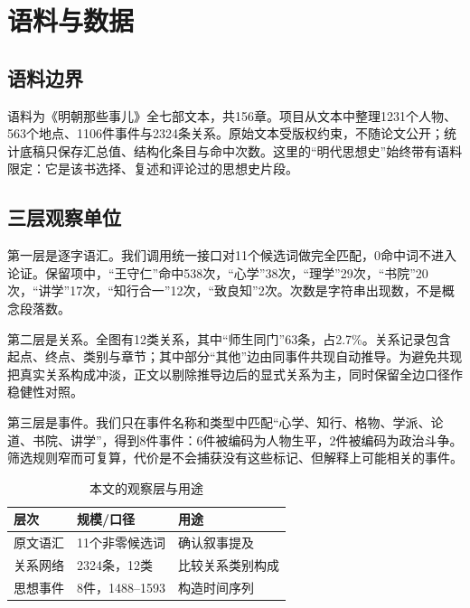 \section{语料与数据}

\subsection{语料边界}

语料为《明朝那些事儿》全七部文本，共156章。项目从文本中整理1231个人物、563个地点、1106件事件与2324条关系。原始文本受版权约束，不随论文公开；统计底稿只保存汇总值、结构化条目与命中次数。这里的“明代思想史”始终带有语料限定：它是该书选择、复述和评论过的思想史片段。

\subsection{三层观察单位}

第一层是逐字语汇。我们调用统一接口对11个候选词做完全匹配，0命中词不进入论证。保留项中，“王守仁”命中538次，“心学”38次，“理学”29次，“书院”20次，“讲学”17次，“知行合一”12次，“致良知”2次。次数是字符串出现数，不是概念段落数。

第二层是关系。全图有12类关系，其中“师生同门”63条，占2.7\%。关系记录包含起点、终点、类别与章节；其中部分“其他”边由同事件共现自动推导。为避免共现把真实关系构成冲淡，正文以剔除推导边后的显式关系为主，同时保留全边口径作稳健性对照。

第三层是事件。我们只在事件名称和类型中匹配“心学、知行、格物、学派、论道、书院、讲学”，得到8件事件：6件被编码为人物生平，2件被编码为政治斗争。筛选规则窄而可复算，代价是不会捕获没有这些标记、但解释上可能相关的事件。

\begin{table}[!t]
\caption{本文的观察层与用途}
\label{tab:ideology-data}
\centering
\begin{tabular}{@{}lll@{}}
\toprule
层次 & 规模/口径 & 用途 \\
\midrule
原文语汇 & 11个非零候选词 & 确认叙事提及 \\
关系网络 & 2324条，12类 & 比较关系类别构成 \\
思想事件 & 8件，1488--1593 & 构造时间序列 \\
\bottomrule
\end{tabular}
\end{table}
